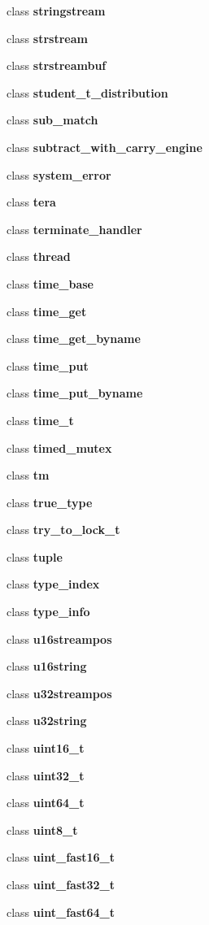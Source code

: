 \begin{DoxyCompactItemize}
\item 
class {\bf stringstream}
\item 
class {\bf strstream}
\item 
class {\bf strstreambuf}
\item 
class {\bf student\+\_\+t\+\_\+distribution}
\item 
class {\bf sub\+\_\+match}
\item 
class {\bf subtract\+\_\+with\+\_\+carry\+\_\+engine}
\item 
class {\bf system\+\_\+error}
\item 
class {\bf tera}
\item 
class {\bf terminate\+\_\+handler}
\item 
class {\bf thread}
\item 
class {\bf time\+\_\+base}
\item 
class {\bf time\+\_\+get}
\item 
class {\bf time\+\_\+get\+\_\+byname}
\item 
class {\bf time\+\_\+put}
\item 
class {\bf time\+\_\+put\+\_\+byname}
\item 
class {\bf time\+\_\+t}
\item 
class {\bf timed\+\_\+mutex}
\item 
class {\bf tm}
\item 
class {\bf true\+\_\+type}
\item 
class {\bf try\+\_\+to\+\_\+lock\+\_\+t}
\item 
class {\bf tuple}
\item 
class {\bf type\+\_\+index}
\item 
class {\bf type\+\_\+info}
\item 
class {\bf u16streampos}
\item 
class {\bf u16string}
\item 
class {\bf u32streampos}
\item 
class {\bf u32string}
\item 
class {\bf uint16\+\_\+t}
\item 
class {\bf uint32\+\_\+t}
\item 
class {\bf uint64\+\_\+t}
\item 
class {\bf uint8\+\_\+t}
\item 
class {\bf uint\+\_\+fast16\+\_\+t}
\item 
class {\bf uint\+\_\+fast32\+\_\+t}
\item 
class {\bf uint\+\_\+fast64\+\_\+t}
\item 

\end{DoxyCompactItemize}
